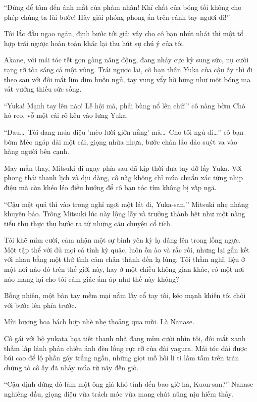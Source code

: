 \documentclass[../main.tex]{subfiles}
\begin{document}
``Đừng để tâm đến ánh mắt của phàm nhân! Khí chất của bóng tối không cho phép chúng ta lùi bước! Hãy giải phóng phong ấn trên cánh tay ngươi đi!''

Tôi lắc đầu ngao ngán, định bước tới giải vây cho cô bạn nhút nhát thì một tổ hợp trái ngược hoàn toàn khác lại thu hút sự chú ý của tôi.

Akane, với mái tóc tết gọn gàng năng động, đang nhảy cực kỳ sung sức, nụ cười rạng rỡ tỏa sáng cả một vùng. Trái ngược lại, cô bạn thân Yuka của cậu ấy thì đi theo sau với đôi mắt lim dim buồn ngủ, tay vung vẩy hờ hững như một bóng ma vất vưởng thiếu sức sống.

``Yuka! Mạnh tay lên nào! Lễ hội mà, phải bùng nổ lên chứ!'' cô nàng bờm Chó hò reo, vỗ một cái rõ kêu vào lưng Yuka.

``Đau\dots\ Tôi đang múa điệu 'mèo lười giỡn nắng' mà\dots\ Cho tôi ngủ đi\dots'' cô bạn bờm Mèo ngáp dài một cái, giọng nhừa nhựa, bước chân lảo đảo suýt va vào hàng người bên cạnh.

May mắn thay, Mitsuki đi ngay phía sau đã kịp thời đưa tay đỡ lấy Yuka. Với phong thái thanh lịch và dịu dàng, cô nàg không chỉ múa chuẩn xác từng nhịp điệu mà còn khéo léo điều hướng để cô bạn tóc tím không bị vấp ngã.

``Cậu mệt quá thì vào trong nghỉ ngơi một lát đi, Yuka-san,'' Mitsuki nhẹ nhàng khuyên bảo. Trông Mitsuki lúc này lộng lẫy và trưởng thành hệt như một nàng tiểu thư thực thụ bước ra từ những câu chuyện cổ tích.

Tôi khẽ mỉm cười, cảm nhận một sự bình yên kỳ lạ dâng lên trong lồng ngực. Một tập thể với đủ mọi cá tính kỳ quặc, luôn ồn ào và rắc rối, nhưng lại gắn kết với nhau bằng một thứ tình cảm chân thành đến lạ lùng. Tôi thầm nghĩ, liệu ở một nơi nào đó trên thế giới này, hay ở một chiều không gian khác, có một nơi nào mang lại cho tôi cảm giác ấm áp như thế này không?

Bỗng nhiên, một bàn tay mềm mại nắm lấy cổ tay tôi, kéo mạnh khiến tôi chới với bước lên phía trước.

Mùi hương hoa bách hợp nhè nhẹ thoảng qua mũi. Là Nanase.

Cô gái với bộ yukata họa tiết thanh nhã đang mỉm cười nhìn tôi, đôi mắt xanh thẫm lấp lánh phản chiếu ánh đèn lồng rực rỡ của đài yagura. Mái tóc dài được búi cao để lộ phần gáy trắng ngần, những giọt mồ hôi li ti lấm tấm trên trán chứng tỏ cô ấy đã nhảy múa từ nãy đến giờ.

``Cậu định đứng đó làm một ông già khó tính đến bao giờ hả, Kuon-san?'' Nanase nghiêng đầu, giọng điệu vừa trách móc vừa mang chút nũng nịu hiếm thấy.
\end{document}

